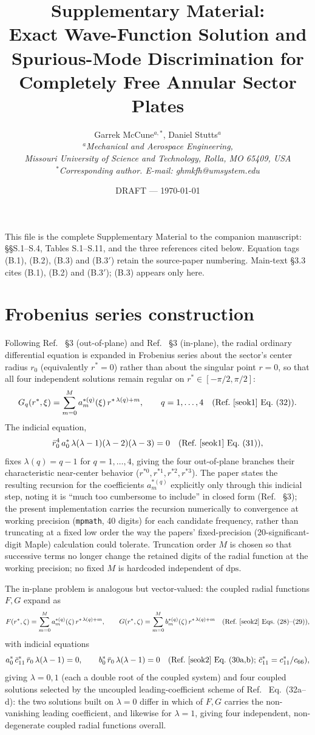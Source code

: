 \documentclass[11pt]{article}
\title{\bfseries Supplementary Material:\\
Exact Wave-Function Solution and Spurious-Mode Discrimination
for Completely Free Annular Sector Plates}
\author{Garrek McCune$^{a,*}$, Daniel Stutts$^{a}$\\
\small\itshape $^a$Mechanical and Aerospace Engineering,\\
Missouri University of Science and Technology, Rolla, MO 65409, USA\\
\small\upshape $^*$Corresponding author. E-mail: ghmkfh@umsystem.edu}
\date{DRAFT --- \today}
\begin{document}
\maketitle

\noindent
This file is the complete Supplementary Material to the companion
manuscript: §§S.1--S.4, Tables S.1--S.11, and the three references
cited below. Equation tags (B.1), (B.2), (B.3) and (B.3$'$) retain the
source-paper numbering. Main-text \S3.3 cites (B.1), (B.2) and
(B.3$'$); (B.3) appears only here.

\section{Frobenius series construction}\label{sec:frobenius-appendix}
Following Ref.~\cite{seok1} \S3 (out-of-plane) and Ref.~\cite{seok2} \S3
(in-plane), the radial ordinary differential equation is expanded in
Frobenius series about the sector's center radius $r_0$ (equivalently
$r^{*}=0$) rather than about the singular point $r=0$, so that all four
independent solutions remain regular on $r^{*}\in[-\pi/2,\pi/2]$:
\[
G_q(r^{*},\xi)=\sum_{m=0}^{M}a^{*(q)}_m(\xi)\,r^{*\,\lambda(q)+m},
\qquad q=1,\dots,4 \quad\text{(Ref.~\cite{seok1} Eq.~(32))}.
\]
The indicial equation,
\[
\bar r_0^{4}\,a^{*}_0\,\lambda(\lambda-1)(\lambda-2)(\lambda-3)=0
\quad\text{(Ref.~\cite{seok1} Eq.~(31))},
\]
fixes $\lambda(q)=q-1$ for $q=1,\dots,4$, giving the four out-of-plane
branches their characteristic near-center behavior ($r^{*0},r^{*1},r^{*2},
r^{*3}$). The paper states the resulting recursion for the coefficients
$a^{*(q)}_m$ explicitly only through this indicial step, noting it is
``much too cumbersome to include'' in closed form (Ref.~\cite{seok1} \S3);
the present implementation carries the recursion numerically to
convergence at working precision (\texttt{mpmath}, 40 digits) for each
candidate frequency, rather than truncating at a fixed low order the way
the papers' fixed-precision (20-significant-digit Maple) calculation could
tolerate. Truncation order $M$ is chosen so that successive terms no longer
change the retained digits of the radial function at the working
precision; no fixed $M$ is hardcoded independent of $\text{dps}$.

The in-plane problem is analogous but vector-valued: the coupled radial
functions $F,G$ expand as
\[
F(r^{*},\zeta)=\sum_{m=0}^{M}a^{*(q)}_m(\zeta)\,r^{*\,\lambda(q)+m},\qquad
G(r^{*},\zeta)=\sum_{m=0}^{M}b^{*(q)}_m(\zeta)\,r^{*\,\lambda(q)+m}
\quad\text{(Ref.~\cite{seok2} Eqs.~(28)--(29))},
\]
with indicial equations
\[
a^{*}_0\,\bar{c}^{*}_{11}\,\bar r_0\,\lambda(\lambda-1)=0,\qquad
b^{*}_0\,\bar r_0\,\lambda(\lambda-1)=0 \quad\text{(Ref.~\cite{seok2}
Eq.~(30a,b); \(\bar{c}^{*}_{11}=c^{*}_{11}/c_{66}\))},
\]
giving $\lambda=0,1$ (each a double root of the coupled system) and four
coupled solutions selected by the uncoupled leading-coefficient scheme of
Ref.~\cite{seok2} Eq.~(32a--d): the two solutions built on $\lambda=0$
differ in which of $F,G$ carries the non-vanishing leading coefficient, and
likewise for $\lambda=1$, giving four independent, non-degenerate coupled
radial functions overall.
\end{document}
